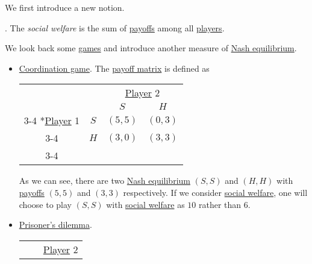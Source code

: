 We first introduce a new notion.
\begin{definition}\label{def:social-welfare}.
	The \emph{social welfare} is the sum of \hyperref[def:reward]{payoffs} among all \hyperref[def:player]{players}.
\end{definition}
\begin{prev}
	We look back some \hyperref[def:game]{games} and introduce another measure of \hyperref[def:Nash-equilibrium]{Nash equilibrium}.
	\begin{itemize}
		\item \hyperref[def:coordination-game]{Coordination game}. The \hyperref[def:payoff-matrix]{payoff matrix} is defined as
		      \begin{table}[H]
			      \centering
			      \setlength{\extrarowheight}{2pt}
			      \begin{tabular}{cc|c|c|}
				                                                     & \multicolumn{1}{c}{} & \multicolumn{2}{c}{\hyperref[def:player]{Player} 2}                           \\
				                                                     & \multicolumn{1}{c}{} & \multicolumn{1}{c}{$S$}                             & \multicolumn{1}{c}{$H$} \\\cline{3-4}
				      \multirow{2}*{\hyperref[def:player]{Player} 1} & $S$                  & $(5, 5)$                                            & $(0, 3)$                \\\cline{3-4}
				                                                     & $H$                  & $(3, 0)$                                            & $(3, 3)$                \\\cline{3-4}
			      \end{tabular}
		      \end{table}
		      As we can see, there are two \hyperref[def:Nash-equilibrium]{Nash equilibrium} \((S, S)\) and \((H, H)\) with \hyperref[def:reward]{payoffs} \((5, 5)\) and \((3, 3)\) respectively. If we consider \hyperref[def:social-welfare]{social welfare}, one will choose to play \((S, S)\) with \hyperref[def:social-welfare]{social welfare} as \(10\) rather than \(6\).
		\item \hyperref[eg:prisoner-dilemma]{Prisoner's dilemma}.
		      \begin{table}[H]
			      \centering
			      \setlength{\extrarowheight}{2pt}
			      \begin{tabular}{cc|c|c|}
				                                                     & \multicolumn{1}{c}{} & \multicolumn{2}{c}{\hyperref[def:player]{Player} 2}                                    \\

\end{tabular}
\end{table}
\end{itemize}
\end{prev}
